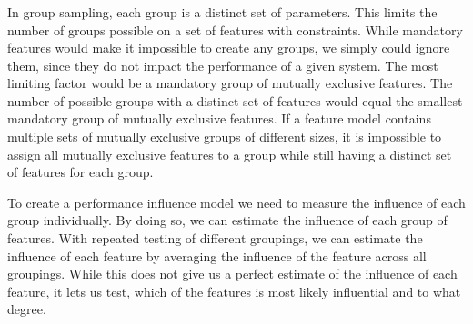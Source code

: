 \documentclass[../../thesis.tex]{subfiles}
\begin{document}
\subsubsection{}

In \citet{saltelli2008global} group sampling, each group is a distinct set of parameters.
This limits the number of groups possible on a set of features with constraints.
While mandatory features would make it impossible to create any groups, we simply could ignore them, since they do not impact the
performance of a given system. The most limiting factor would be a mandatory group of mutually exclusive features.
The number of possible groups with a distinct set of features would equal the smallest mandatory group of mutually exclusive features.
If a feature model contains multiple sets of mutually exclusive groups of different sizes, it is impossible
to assign all mutually exclusive features to a group while still having a distinct set of features for each group.

To create a performance influence model we need to measure the influence of each group individually.
By doing so, we can estimate the influence of each group of features. With repeated testing of different groupings,
we can estimate the influence of each feature by averaging the influence of the feature across all groupings.
While this does not give us a perfect estimate of the influence of each feature, it lets us test, which
of the features is most likely influential and to what degree.
\end{document}
